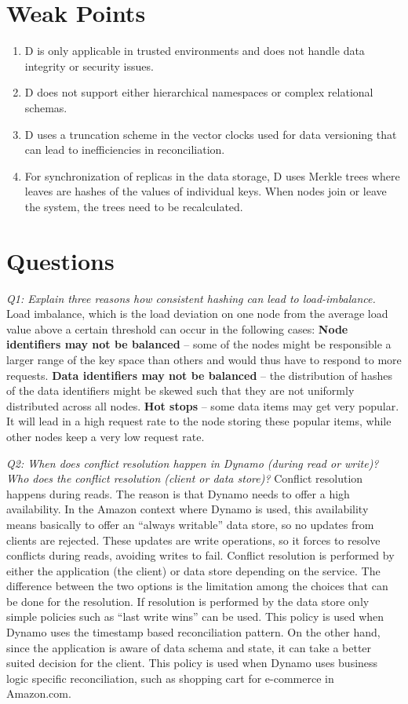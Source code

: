 \documentclass[10pt]{proc}
\begin{document}
\section{Weak Points}
\begin{enumerate}
\item D is only applicable in trusted environments and does not handle data integrity or security issues. 
\item D does not support either hierarchical namespaces or complex relational schemas.
\item D uses a truncation scheme in the vector clocks used for data versioning that can lead to inefficiencies in reconciliation.
\item For synchronization of replicas in the data storage, D uses Merkle trees where leaves are hashes of the values of individual keys. When nodes join or leave the system, the trees need to be recalculated. 
\end{enumerate}


\section{Questions}
\emph{Q1: Explain three reasons how consistent hashing can lead to load-imbalance.}
Load imbalance, which is the load deviation on one node from the average load value above a certain threshold can occur in the following cases:
\textbf{Node identifiers may not be balanced} -- some of the nodes might be responsible a larger range of the key space than others and would thus have to respond to more requests.
\textbf{Data identifiers may not be balanced} -- the distribution of hashes of the data identifiers might be skewed such that they are not uniformly distributed across all nodes. 
\textbf{Hot stops} -- some data items may get very popular. It will lead in a high request rate to the node storing these popular items, while other nodes keep a very low request rate. 


\emph{Q2: When does conflict resolution happen in Dynamo (during read or write)? Who does the conflict resolution (client or data store)?}
Conflict resolution happens during reads. The reason is that Dynamo needs to offer a high availability. In the Amazon context where Dynamo is used, this availability means basically to offer an “always writable” data store, so no updates from clients are rejected. These updates are write operations, so it forces to resolve conflicts during reads, avoiding writes to fail. 
Conflict resolution is performed by either the application (the client) or data store depending on the service. The difference between the two options is the limitation among the choices that can be done for the resolution. If resolution is performed by the data store only simple policies such as “last write wins” can be used. This policy is used when Dynamo uses the timestamp based reconciliation pattern. On the other hand, since the application is aware of data schema and state, it can take a better suited decision for the client. This policy is used when Dynamo uses business logic specific reconciliation, such as shopping cart for e-commerce in Amazon.com. 
 




\end{document}
